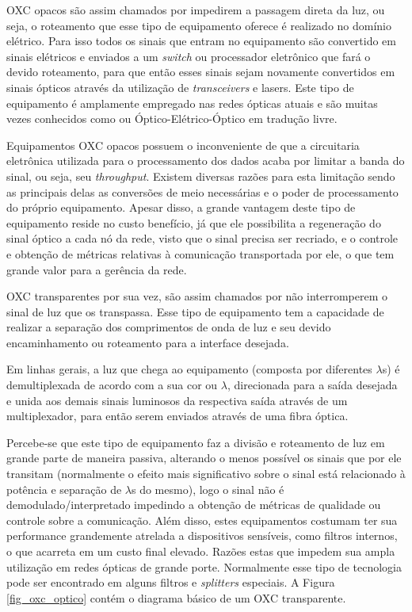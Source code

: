 OXC opacos são assim chamados por impedirem a passagem direta da luz, ou seja, o roteamento que esse tipo de equipamento oferece é realizado no domínio elétrico. Para isso todos os sinais que entram no equipamento são convertido em sinais elétricos e enviados a um \emph{switch} ou processador eletrônico que fará o devido roteamento, para que então esses sinais sejam novamente convertidos em sinais ópticos através da utilização de \emph{transceivers} e lasers. Este tipo de equipamento é amplamente empregado nas redes ópticas atuais e são muitas vezes conhecidos como  ou Óptico-Elétrico-Óptico em tradução livre.

Equipamentos OXC opacos possuem o inconveniente de que a circuitaria eletrônica utilizada para o processamento dos dados acaba por limitar a banda do sinal, ou seja, seu \emph{throughput}. Existem diversas razões para esta limitação sendo as principais delas as conversões de meio necessárias e o poder de processamento do próprio equipamento. Apesar disso, a grande vantagem deste tipo de equipamento reside no custo benefício, já que ele possibilita a regeneração do sinal óptico a cada nó da rede, visto que o sinal precisa ser recriado, e o controle e obtenção de métricas relativas à comunicação transportada por ele, o que tem grande valor para a gerência da rede.  

OXC transparentes por sua vez, são assim chamados por não interromperem o sinal de luz que os transpassa. Esse tipo de equipamento tem a capacidade de realizar a separação dos comprimentos de onda de luz e seu devido encaminhamento ou roteamento para a interface desejada. 

Em linhas gerais, a luz que chega ao equipamento (composta por diferentes $\lambda$s) é demultiplexada de acordo com a sua cor ou $\lambda$, direcionada para a saída desejada e unida aos demais sinais luminosos da respectiva saída através de um multiplexador, para então serem enviados através de uma fibra óptica. 

Percebe-se que este tipo de equipamento faz a divisão e roteamento de luz em grande parte de maneira passiva, alterando o menos possível os sinais que por ele transitam (normalmente o efeito mais significativo sobre o sinal está relacionado à potência e separação de $\lambda$s do mesmo), logo o sinal não é demodulado/interpretado impedindo a obtenção de métricas de qualidade ou controle sobre a comunicação. Além disso, estes equipamentos costumam ter sua performance grandemente atrelada a dispositivos sensíveis, como filtros internos, o que acarreta em um custo final elevado. Razões estas que impedem sua ampla utilização em redes ópticas de grande porte. Normalmente esse tipo de tecnologia pode ser encontrado em alguns filtros e \emph{splitters} especiais. A Figura \ref{fig_oxc_optico} contém o diagrama básico de um OXC transparente. 

